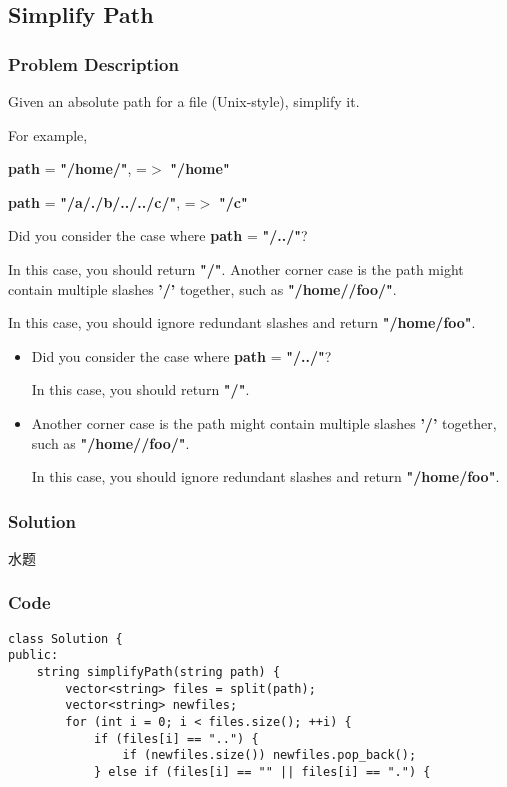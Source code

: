 \documentclass[courier]{article}
\begin{document}
\begin{CJK*}{UTF8}{gkai}
\subsection{ Simplify Path }

\subsubsection*{Problem Description}
Given an absolute path for a file (Unix-style), simplify it.

For example,


\textbf{path} = \textbf{"/home/"}, =$>$ \textbf{"/home"}


\textbf{path} = \textbf{"/a/./b/../../c/"}, =$>$ \textbf{"/c"}

Did you consider the case where \textbf{path} = \textbf{"/../"}?


In this case, you should return \textbf{"/"}.
Another corner case is the path might contain multiple slashes \textbf{'/'} together, such as \textbf{"/home//foo/"}.


In this case, you should ignore redundant slashes and return \textbf{"/home/foo"}.
\begin{itemize}
\item Did you consider the case where \textbf{path} = \textbf{"/../"}?


In this case, you should return \textbf{"/"}.
\item Another corner case is the path might contain multiple slashes \textbf{'/'} together, such as \textbf{"/home//foo/"}.


In this case, you should ignore redundant slashes and return \textbf{"/home/foo"}.
\end{itemize}



\subsubsection*{Solution}
水题

\subsubsection*{Code}
\begin{lstlisting}
class Solution {
public:
    string simplifyPath(string path) {
        vector<string> files = split(path);
        vector<string> newfiles;
        for (int i = 0; i < files.size(); ++i) {
            if (files[i] == "..") {
                if (newfiles.size()) newfiles.pop_back();
            } else if (files[i] == "" || files[i] == ".") {
                

\end{lstlisting}
\end{CJK*}
\end{document}

